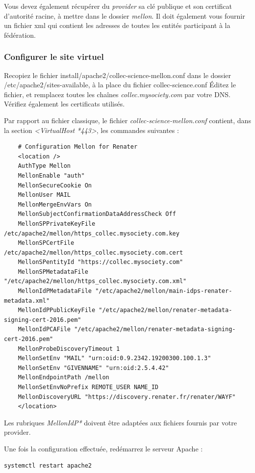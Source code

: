 Vous devez également récupérer du \textit{provider} sa clé publique et son certificat d'autorité racine, à mettre dans le dossier \textit{mellon}. Il doit également vous fournir un fichier xml qui contient les adresses de toutes les entités participant à la fédération.

\subsubsection{Configurer le site virtuel}

Recopiez le fichier install/apache2/collec-science-mellon.conf dans le dossier /etc/apache2/sites-available, à la place du fichier collec-science.conf
Éditez le fichier, et remplacez toutes les chaînes \textit{collec.mysociety.com} par votre DNS. Vérifiez également les certificats utilisés.

Par rapport au fichier classique, le fichier \textit{collec-science-mellon.conf} contient, dans la section \textit{<VirtualHost *443>}, les commandes suivantes :
\begin{lstlisting}
    # Configuration Mellon for Renater
    <location />
    AuthType Mellon
    MellonEnable "auth"
    MellonSecureCookie On
    MellonUser MAIL
    MellonMergeEnvVars On
    MellonSubjectConfirmationDataAddressCheck Off
    MellonSPPrivateKeyFile /etc/apache2/mellon/https_collec.mysociety.com.key
    MellonSPCertFile /etc/apache2/mellon/https_collec.mysociety.com.cert
    MellonSPentityId "https://collec.mysociety.com"
    MellonSPMetadataFile "/etc/apache2/mellon/https_collec.mysociety.com.xml"
    MellonIdPMetadataFile "/etc/apache2/mellon/main-idps-renater-metadata.xml"
    MellonIdPPublicKeyFile "/etc/apache2/mellon/renater-metadata-signing-cert-2016.pem"
    MellonIdPCAFile "/etc/apache2/mellon/renater-metadata-signing-cert-2016.pem"
    MellonProbeDiscoveryTimeout 1
    MellonSetEnv "MAIL" "urn:oid:0.9.2342.19200300.100.1.3"
    MellonSetEnv "GIVENNAME" "urn:oid:2.5.4.42"
    MellonEndpointPath /mellon
    MellonSetEnvNoPrefix REMOTE_USER NAME_ID
    MellonDiscoveryURL "https://discovery.renater.fr/renater/WAYF"
    </location>
\end{lstlisting}

Les rubriques \textit{MellonIdP*} doivent être adaptées aux fichiers fournis par votre provider.

Une fois la configuration effectuée, redémarrez le serveur Apache :
\begin{lstlisting}
systemctl restart apache2
\end{lstlisting}

